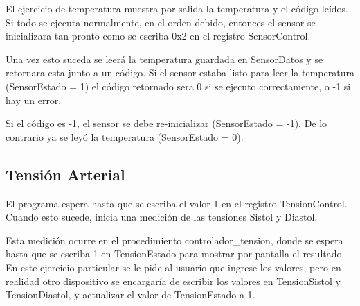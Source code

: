 \documentclass[titlepage]{article}
\begin{document}
El ejercicio de temperatura muestra por salida la temperatura y el código leídos. Si todo se ejecuta normalmente, en el orden debido, entonces el sensor se inicializara tan pronto como se escriba 0x2 en el registro SensorControl.

Una vez esto suceda se leerá la temperatura guardada en SensorDatos y se retornara esta junto a un código. Si el sensor estaba listo para leer la temperatura (SensorEstado = 1) el código retornado sera 0 si se ejecuto correctamente, o -1 si hay un error.

Si el código es -1, el sensor se debe re-inicializar (SensorEstado = -1). De lo contrario ya se leyó la temperatura (SensorEstado = 0).

\subsection{Tensión Arterial}

El programa espera hasta que se escriba el valor 1 en el registro TensionControl. Cuando esto sucede, inicia una medición de las tensiones Sistol y Diastol.

Esta medición ocurre en el procedimiento controlador\_tension, donde se espera hasta que se escriba 1 en TensionEstado para mostrar por pantalla el resultado. En este ejercicio particular se le pide al usuario que ingrese los valores, pero en realidad otro dispositivo se encargaría de escribir los valores en TensionSistol y TensionDiastol, y actualizar el valor de TensionEstado a 1.
\end{document}
